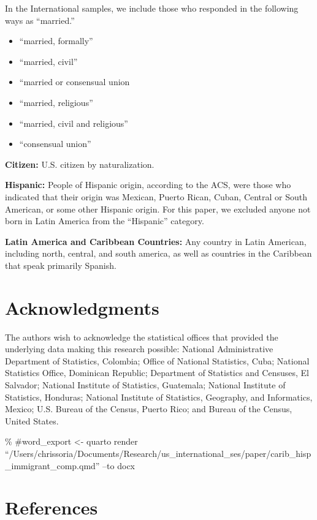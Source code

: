 \documentclass[
]{article}
\begin{document}
In the International samples, we include those who responded in the
following ways as ``married.''

\begin{itemize}
\item
  ``married, formally''
\item
  ``married, civil''
\item
  ``married or consensual union
\item
  ``married, religious''
\item
  ``married, civil and religious''
\item
  ``consensual union''
\end{itemize}

\textbf{Citizen:} U.S. citizen by naturalization.

\textbf{Hispanic:} People of Hispanic origin, according to the ACS, were
those who indicated that their origin was Mexican, Puerto Rican, Cuban,
Central or South American, or some other Hispanic origin. For this
paper, we excluded anyone not born in Latin America from the
``Hispanic'' category.

\textbf{Latin America and Caribbean Countries:} Any country in Latin
American, including north, central, and south america, as well as
countries in the Caribbean that speak primarily Spanish.

\newpage
\section*{Acknowledgments}

The authors wish to acknowledge the statistical offices that provided
the underlying data making this research possible: National
Administrative Department of Statistics, Colombia; Office of National
Statistics, Cuba; National Statistics Office, Dominican Republic;
Department of Statistics and Censuses, El Salvador; National Institute
of Statistics, Guatemala; National Institute of Statistics, Honduras;
National Institute of Statistics, Geography, and Informatics, Mexico;
U.S. Bureau of the Census, Puerto Rico; and Bureau of the Census, United
States.

\newpage

\newpage

\% \#word\_export \textless- quarto render
``/Users/chrissoria/Documents/Research/us\_international\_ses/paper/carib\_hisp\_immigrant\_comp.qmd''
--to docx

\section*{References}\label{references}
\end{document}
